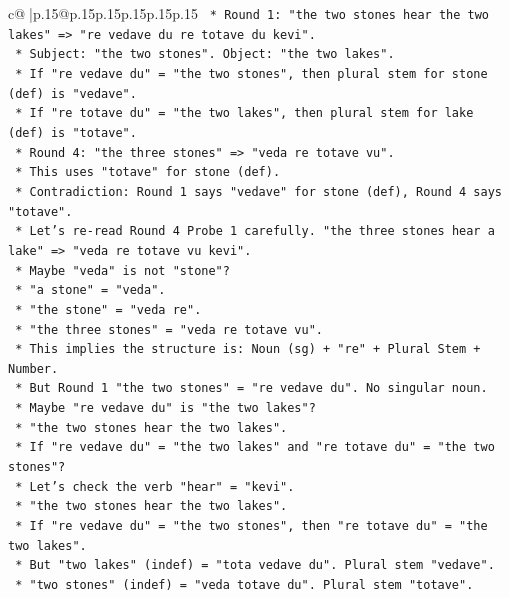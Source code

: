 \documentclass{article}
\begin{document}
{\begin{supertabular}{c@{$\;$}|p{.15\linewidth}@{}p{.15\linewidth}p{.15\linewidth}p{.15\linewidth}p{.15\linewidth}p{.15\linewidth}}
{{{\texttt{        *   Round 1: "the two stones hear the two lakes" => "re vedave du re totave du kevi".} \\
\texttt{        *   Subject: "the two stones". Object: "the two lakes".} \\
\texttt{        *   If "re vedave du" = "the two stones", then plural stem for stone (def) is "vedave".} \\
\texttt{        *   If "re totave du" = "the two lakes", then plural stem for lake (def) is "totave".} \\
\texttt{        *   Round 4: "the three stones" => "veda re totave vu".} \\
\texttt{        *   This uses "totave" for stone (def).} \\
\texttt{        *   Contradiction: Round 1 says "vedave" for stone (def), Round 4 says "totave".} \\
\texttt{        *   Let's re{-}read Round 4 Probe 1 carefully. "the three stones hear a lake" => "veda re totave vu kevi".} \\
\texttt{        *   Maybe "veda" is not "stone"?} \\
\texttt{        *   "a stone" = "veda".} \\
\texttt{        *   "the stone" = "veda re".} \\
\texttt{        *   "the three stones" = "veda re totave vu".} \\
\texttt{        *   This implies the structure is: Noun (sg) + "re" + Plural Stem + Number.} \\
\texttt{        *   But Round 1 "the two stones" = "re vedave du". No singular noun.} \\
\texttt{        *   Maybe "re vedave du" is "the two lakes"?} \\
\texttt{        *   "the two stones hear the two lakes".} \\
\texttt{        *   If "re vedave du" = "the two lakes" and "re totave du" = "the two stones"?} \\
\texttt{        *   Let's check the verb "hear" = "kevi".} \\
\texttt{        *   "the two stones hear the two lakes".} \\
\texttt{        *   If "re vedave du" = "the two stones", then "re totave du" = "the two lakes".} \\
\texttt{        *   But "two lakes" (indef) = "tota vedave du". Plural stem "vedave".} \\
\texttt{        *   "two stones" (indef) = "veda totave du". Plural stem "totave".} \\
}}}
\end{supertabular}}
\end{document}
